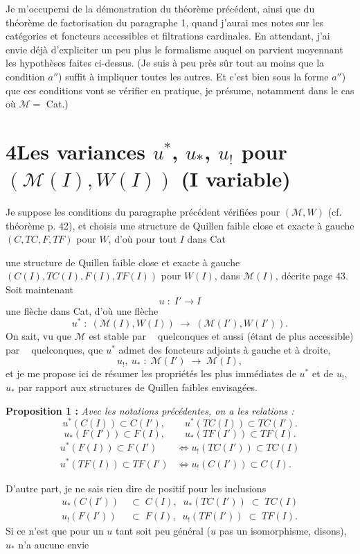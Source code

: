 \documentclass[11pt]{article}
\newcommand{\printedpage}[1]{\marginpar{\footnotesize p.~#1}}
\newcommand{\msp}[1]{\marginpar{\footnotesize [#1]}}
\newcommand{\M}{\mathcal{M}}
\newcommand{\limind}{\mathop{\underrightarrow{\mathrm{lim}}}}
\newcommand{\limproj}{\mathop{\underleftarrow{\mathrm{lim}}}}
\begin{document}
\noindent\msp{page 44}

Je m'occuperai de la démonstration du théorème précédent, ainsi que du théorème de factorisation du paragraphe 1, quand j'aurai mes notes sur les catégories et foncteurs accessibles et filtrations cardinales. En attendant, j'ai envie déjà d'expliciter un peu plus le formalisme auquel on parvient moyennant les hypothèses faites ci-dessus. (Je suis à peu près sûr tout au moins que la condition $a''$) suffit à impliquer toutes les autres. Et c'est bien sous la forme $a''$) que ces conditions vont se vérifier en pratique, je présume, notamment dans le cas où $\M = $ Cat.)

\section*{4\quad Les variances $u^*$, $u_*$, $u_{!}$ pour $(\M(I),W(I))$ (I variable)}

Je suppose les conditions du paragraphe précédent vérifiées pour $(\M,W)$ (cf. théorème p. 42), et choisis une structure de Quillen faible close et exacte à gauche $(C,TC,F,TF)$ pour $W$, d'où pour tout $I$ dans Cat

\noindent\msp{page 45}

\noindent une structure de Quillen faible close et exacte à gauche $(C(I),TC(I),F(I),TF(I))$ pour $W(I)$, dans $\M(I)$, décrite page 43. Soit maintenant
\[
u \;:\; I' \longrightarrow I
\]
une flèche dans Cat, d'où une flèche
\[
u^* \;:\; (\M(I),W(I)) \;\longrightarrow\; (\M(I'),W(I')).
\]
On sait, vu que $\M$ est stable par $\limind$ quelconques et aussi (étant de plus accessible) par $\limproj$ quelconques, que $u^*$ admet des foncteurs adjoints à gauche et à droite,
\[
u_{!},\ u_* \;:\; \M(I') \;\longrightarrow\; \M(I),
\]
\printedpage{26}
et je me propose ici de résumer les propriétés les plus immédiates de $u^*$ et de $u_{!}$, $u_*$ par rapport aux structures de Quillen faibles envisagées.

\textbf{Proposition 1 :} \textit{Avec les notations précédentes, on a les relations :}
\[
u^*(C(I)) \subset C(I'), \qquad u^*(TC(I)) \subset TC(I'). \tag*{(1)}
\]
\[
u_*(F(I')) \subset F(I), \qquad u_*(TF(I')) \subset TF(I). \tag*{(2)}
\]
\[
\begin{aligned}
u^*(F(I)) \subset F(I') &\iff u_{!}(TC(I')) \subset TC(I)\\
u^*(TF(I)) \subset TF(I') &\iff u_{!}(C(I')) \subset C(I).
\end{aligned} \tag*{(3)}
\]

D'autre part, je ne sais rien dire de positif pour les inclusions
\[
\begin{aligned}
u_*(C(I')) \;&\subset\; C(I), \;\; u_*(TC(I')) \;\subset\; TC(I)\\
u_{!}(F(I')) \;&\subset\; F(I), \;\; u_{!}(TF(I')) \;\subset\; TF(I).
\end{aligned}
\]
Si ce n'est que pour un $u$ tant soit peu général ($u$ pas un isomorphisme, disons), $u_*$ n'a aucune envie
\end{document}

